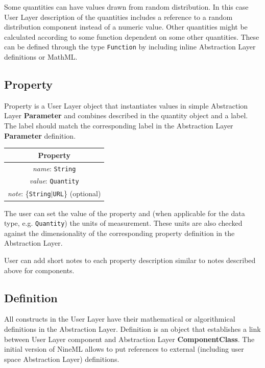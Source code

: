 \documentclass{article}
\newcommand{\ComponentClass}{{\bf{ComponentClass}}\xspace}
\newcommand{\Parameter}{{\bf{Parameter}}\xspace}
\begin{document}
Some quantities can have values drawn from random distribution. In
this case User Layer description of the quantities includes a
reference to a random distribution component instead of a numeric
value.  Other quantities might be calculated according to some
function dependent on some other quantities. These can be defined
through the type {\tt Function} by including inline Abstraction Layer
definitions or MathML.

\subsection{Property}

Property is a User Layer object that instantiates values in simple
Abstraction Layer \Parameter and combines described in the quantity object
and a label. The label should match the corresponding label in the
Abstraction Layer \Parameter definition.

\begin{table}[htb]
\center
\begin{tabular}{|c|}
\hline
\hline
Property \\
\hline
\hline
{\em name}: {\tt String} \\
\hline
{\em value}: {\tt Quantity} \\
\hline
{\em note}: \{{\tt String}$|${\tt URL}\} (optional)\\
\hline
\end{tabular}
\end{table}

The user can set the value of the property and (when applicable for the data
type, e.g. {\tt Quantity}) the units of measurement. These units are also
checked against the dimensionality of the corresponding property definition
in the Abstraction Layer.

User can add short notes to each property description similar to notes
described above for components.

\subsection{Definition}

All constructs in the User Layer have their mathematical or algorithmical
definitions in the Abstraction Layer. Definition is an object that
establishes a link between User Layer component and Abstraction Layer
\ComponentClass. The initial version of NineML allows to put references
to external (including user space Abstraction Layer) definitions.
\end{document}
